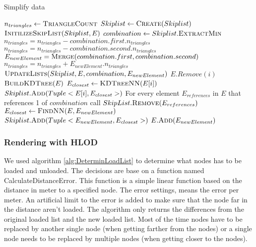 \begin{algorithm}[h]
\caption{Simplify data}\label{alg:SimplifyData}
\begin{algorithmic}[1]
 
\State {}
\State $n_{triangles} \gets \Call{TriangleCount}{}$
\State $Skiplist \gets \Call{Create}{Skiplist}$ 
\State $\Call{InitilizeSkipList}{Skiplist, E}$
    \State $combination \gets Skiplist.\Call{ExtractMin}{}$
    \State $n_{triangles} = n_{triangles} - combination.first.n_{triangles}$
    \State $n_{triangles} = n_{triangles} - combination.second.n_{triangles}$
    \State $E_{newElement} = \Call{Merge}{combination.first, combination.second}$
    \State $n_{triangles} = n_{triangles} + E_{newElement}.n_{triangles}$
    \State $\Call{UpdateLists}{Skiplist, E, combination, E_{newElement}}$
\EndWhile
\EndProcedure
{}
        \State $E.Remove(i)$
    \EndIf
\EndFor
\EndFunction
{}
\State $\Call{BuildKDTree}{E}$
    \State $E_{closest} \gets \Call{KDTreeNN}{E[i]}$ 
    \State $Skiplist.\Call{Add}{Tuple<E[i], E_{closest}>}$
\EndFor
\EndFunction
{}
\State For every element $E_{references}$ in $E$ that references 1 of $combination$ call $SkipList.\Call{Remove}{E_{references}}$
\State $E_{closest} \gets \Call{FindNN}{E, E_{newElement}}$ 
\State $Skiplist.\Call{Add}{Tuple<E_{newElement}, E_{closest}>}$
\State $E.\Call{Add}{E_{newElement}}$
\EndFunction
\end{algorithmic}
\end{algorithm}

\subsubsection{Rendering with HLOD}
We used algorithm \ref{alg:DeterminLoadList} to determine what nodes has to be loaded and unloaded. The decisions are base on a function named CalculateDistanceError. This function is a simple linear function based on the distance in meter to a specified node. The error settings, means the error per meter. An artificial limit to the error is added to make sure that the node far in the distance aren't loaded. The algorithm only returns the differences from the original loaded list and the new loaded list. Most of the time nodes have to be replaced by another single node (when getting farther from the nodes) or a single node needs to be replaced by multiple nodes (when getting closer to the nodes).

